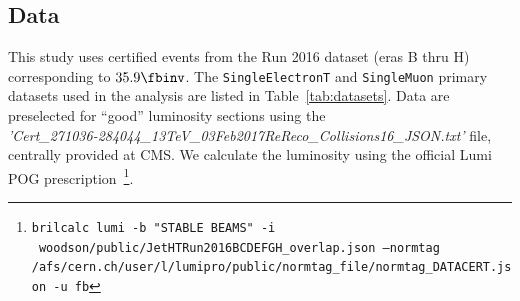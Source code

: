\subsection{Data}
This study uses certified events from the Run 2016 dataset (eras B thru H) corresponding to $35.9\fbinv$.
The \verb|SingleElectronT| and \verb|SingleMuon| primary datasets used in the analysis are listed in Table~\ref{tab:datasets}.
Data are preselected for ``good'' luminosity sections using the \\
{\it 'Cert\_271036-284044\_13TeV\_03Feb2017ReReco\_Collisions16\_JSON.txt'} file,\\
centrally provided at CMS. We calculate the luminosity using the
official Lumi POG prescription~\footnote{\texttt{brilcalc lumi -b "STABLE BEAMS" -i ~woodson/public/JetHTRun2016BCDEFGH\_overlap.json --normtag /afs/cern.ch/user/l/lumipro/public/normtag\_file/normtag\_DATACERT.json -u \/fb}}.


